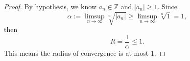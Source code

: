 \begin{Exercise}
	\begin{proof}
		By hypothesis, we know $a_n\in\mathbb{Z}$ and $|a_n|\geq 1$. 
		Since
		$$
		\alpha := \limsup_{n\to\infty} \sqrt[n]{|a_n|}
		\geq \limsup_{n\to\infty} \sqrt[n]{1}
		= 1,
		$$
		then
		$$
		R = \frac{1}{\alpha}
		\leq 1.
		$$
		This means the radius of convergence is at most $1$.
	\end{proof}
\end{Exercise}